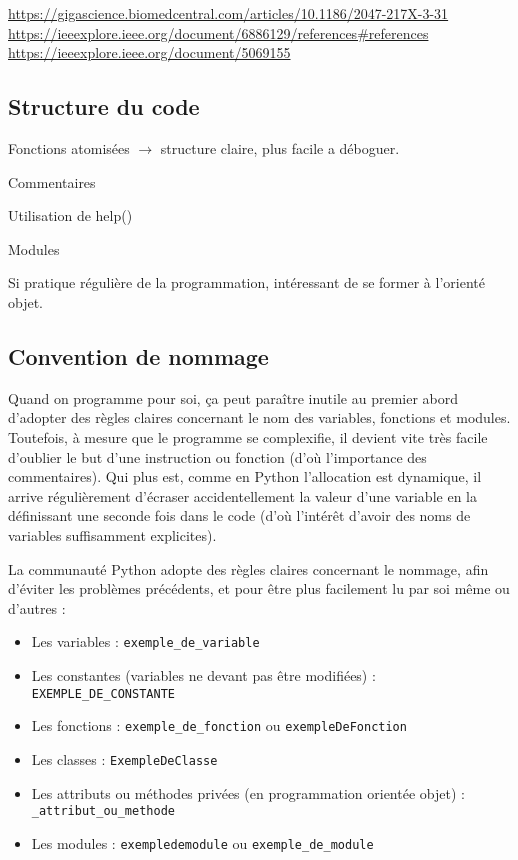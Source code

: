 \documentclass{article}
\begin{document}
\url{https://gigascience.biomedcentral.com/articles/10.1186/2047-217X-3-31}
\url{https://ieeexplore.ieee.org/document/6886129/references#references}
\url{https://ieeexplore.ieee.org/document/5069155}

\subsection*{Structure du code}
Fonctions atomisées $\to$ structure claire, plus facile a déboguer.

Commentaires

Utilisation de help()

Modules

Si pratique régulière de la programmation, intéressant de se former à l'orienté objet.

\subsection*{Convention de nommage}
Quand on programme pour soi, ça peut paraître inutile au premier abord d'adopter des règles claires concernant le nom des variables, fonctions et modules. Toutefois, à mesure que le programme se complexifie, il devient vite très facile d'oublier le but d'une instruction ou fonction (d'où l'importance des commentaires). Qui plus est, comme en Python l'allocation est dynamique, il arrive régulièrement d'écraser accidentellement la valeur d'une variable en la définissant une seconde fois dans le code (d'où l'intérêt d'avoir des noms de variables suffisamment explicites).

La communauté Python adopte des règles claires concernant le nommage, afin d'éviter les problèmes précédents, et pour être plus facilement lu par soi même ou d'autres :

\begin{itemize}
    \item Les variables : \texttt{exemple\_de\_variable}
    \item Les constantes (variables ne devant pas être modifiées) : \texttt{EXEMPLE\_DE\_CONSTANTE}
    \item Les fonctions : \texttt{exemple\_de\_fonction} ou \texttt{exempleDeFonction}
    \item Les classes : \texttt{ExempleDeClasse}
    \item Les attributs ou méthodes privées (en programmation orientée objet) : \texttt{\_attribut\_ou\_methode}
    \item Les modules : \texttt{exempledemodule} ou \texttt{exemple\_de\_module}
\end{itemize}
\end{document}
